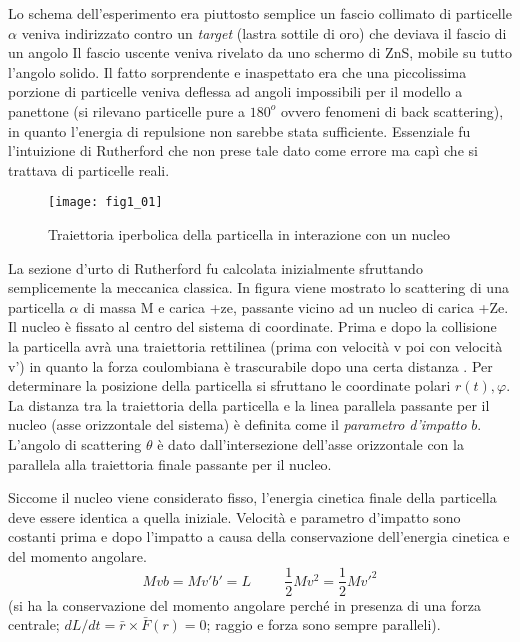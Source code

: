 Lo schema dell'esperimento era piuttosto semplice un fascio collimato di particelle $\alpha$ veniva indirizzato contro un \emph{target} (lastra sottile di oro) che deviava il fascio di un angolo
Il fascio uscente veniva rivelato da uno schermo di ZnS, mobile su tutto l'angolo solido.
Il fatto sorprendente e inaspettato era che una piccolissima porzione di particelle veniva deflessa ad angoli impossibili per il modello a panettone (si rilevano particelle pure a $180^o$ ovvero fenomeni di back scattering), in quanto l'energia di repulsione non sarebbe stata sufficiente.
Essenziale fu l'intuizione di Rutherford che non prese tale dato come errore ma capì che si trattava di particelle reali.
\begin{figure}[h]
\centering
\texttt{[image: fig1\_01]}
\caption{Traiettoria iperbolica della particella in interazione con un nucleo}
\label{fig:1.1}
\end{figure}
La sezione d'urto di Rutherford fu calcolata inizialmente sfruttando semplicemente la meccanica classica.
In figura viene mostrato lo scattering di una particella $\alpha$ di massa M e carica +ze, passante vicino ad un nucleo di carica +Ze.
Il nucleo è fissato al centro del sistema di coordinate.
Prima e dopo la collisione la particella avrà una traiettoria rettilinea (prima con velocità v poi con velocità v') in quanto la forza coulombiana è trascurabile dopo una certa distanza .
Per determinare la posizione della particella si sfruttano le coordinate polari $r(t), \varphi$. 
La distanza tra la traiettoria della particella e la linea parallela passante per il nucleo (asse orizzontale del sistema) è definita come il \emph{parametro d'impatto} $b$.
L'angolo di scattering $\theta$ è dato dall'intersezione dell'asse orizzontale con la parallela alla traiettoria finale passante per il nucleo.

Siccome il nucleo viene considerato fisso, l'energia cinetica finale della particella deve essere identica a quella iniziale. 
Velocità e parametro d'impatto sono costanti prima e dopo l'impatto a causa della conservazione dell'energia cinetica e del momento angolare.
\begin{equation}
Mvb=Mv'b'=L \hspace{1cm} \frac{1}{2}Mv^2=\frac{1}{2}Mv'^2
\end{equation}
(si ha la conservazione del momento angolare perché in presenza di una forza centrale; $dL/dt=\bar r \times \bar F (r)=0$; raggio e forza sono sempre paralleli).

